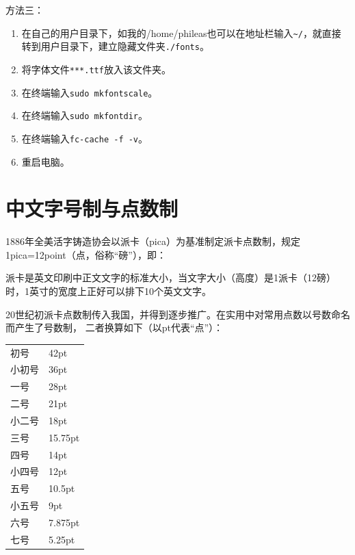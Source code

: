 {方法三：
\begin{enumerate}
\item 在自己的用户目录下，如我的/home/phileas也可以在地址栏输入\verb|~/|，就直接转到用户目录下，建立隐藏文件夹\verb|./fonts|。
\item 将字体文件\verb|***.ttf|放入该文件夹。
\item 在终端输入\verb|sudo mkfontscale|。
\item 在终端输入\verb|sudo mkfontdir|。
\item 在终端输入\verb|fc-cache -f -v|。
\item 重启电脑。
\end{enumerate}



\section{中文字号制与点数制}
1886年全美活字铸造协会以派卡（pica）为基准制定派卡点数制，规定1pica=12point（点，俗称“磅”），即：
\begin{center}
\end{center}
\begin{center}
\end{center}



派卡是英文印刷中正文文字的标准大小，当文字大小（高度）是1派卡（12磅）时，1英寸的宽度上正好可以排下10个英文文字。

20世纪初派卡点数制传入我国，并得到逐步推广。在实用中对常用点数以号数命名而产生了号数制，
 二者换算如下（以pt代表“点”）：
 \begin{center}
 \begin{tabular}{l@{ = }l}
初号& 42pt\\
小初号& 36pt\\
 一号& 28pt\\
 二号& 21pt\\
小二号& 18pt\\
三号& 15.75pt\\
四号& 14pt\\
小四号& 12pt\\
五号& 10.5pt\\
小五号& 9pt\\
六号 & 7.875pt\\
七号 & 5.25pt
\end{tabular}
\end{center}




}
